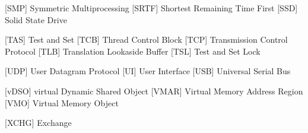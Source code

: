\begin{acronym} [POSIX]
 [SMP] {Symmetric Multiprocessing}
 [SRTF] {Shortest Remaining Time First}
 [SSD] {Solid State Drive}

 [TAS] {Test and Set}
 [TCB] {Thread Control Block}
 [TCP] {Transmission Control Protocol}
 [TLB] {Translation Lookaside Buffer}
 [TSL] {Test and Set Lock}

 [UDP] {User Datagram Protocol} 
  [UI]  {User Interface}
 [USB] {Universal Serial Bus}

 [vDSO] {virtual Dynamic Shared Object}
 [VMAR] {Virtual Memory Address Region}
  [VMO]  {Virtual Memory Object}


 [XCHG] {Exchange}



\end{acronym} 
